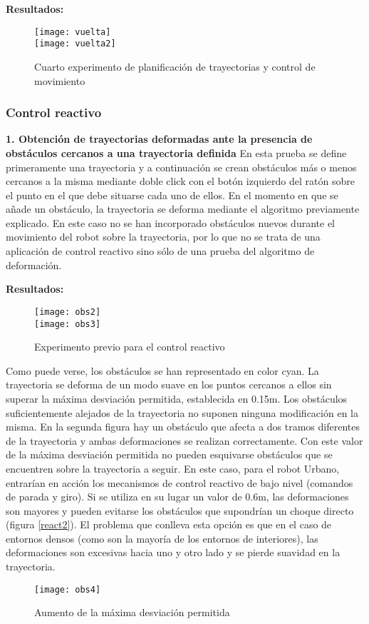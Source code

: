 \textbf{Resultados:}
\begin{figure}[h]
  \centering\texttt{[image: vuelta]}\\
  \hspace{0.5cm}\texttt{[image: vuelta2]}
  \caption{Cuarto experimento de planificación de trayectorias y control de movimiento}\label{fg:mov4}
\end{figure}


\subsubsection{Control reactivo}

\noindent
\textbf{\textbf{1.} Obtención de trayectorias deformadas ante la presencia de obstáculos cercanos a una trayectoria definida}
En esta prueba se define primeramente una trayectoria y a continuación se crean obstáculos más o menos cercanos a la misma mediante doble click con el botón izquierdo del ratón sobre el punto en el que debe situarse cada uno de ellos. En el momento en que se añade un obstáculo, la trayectoria se deforma mediante el algoritmo previamente explicado. En este caso no se han incorporado obstáculos nuevos durante el movimiento del robot sobre la trayectoria, por lo que no se trata de una aplicación de control reactivo sino sólo de una prueba del algoritmo de deformación.

\textbf{Resultados:}
\begin{figure}[h]
  \centering\texttt{[image: obs2]}\\
  \hspace{0.5cm}\texttt{[image: obs3]}
  \caption{Experimento previo para el control reactivo}\label{fg:react1}
\end{figure}


Como puede verse, los obstáculos se han representado en color cyan. La trayectoria se deforma de un modo suave en los puntos cercanos a ellos sin superar la máxima desviación permitida, establecida en 0.15m. Los obstáculos suficientemente alejados de la trayectoria no suponen ninguna modificación en la misma. En la segunda figura hay un obstáculo que afecta a dos tramos diferentes de la trayectoria y ambas deformaciones se realizan correctamente. Con este valor de la máxima desviación permitida no pueden esquivarse obstáculos que se encuentren sobre la trayectoria a seguir. En este caso, para el robot Urbano, entrarían en acción los mecanismos de control reactivo de bajo nivel (comandos de parada y giro). Si se utiliza en su lugar un valor de 0.6m, las deformaciones son mayores y pueden evitarse los obstáculos que supondrían un choque directo (figura \ref{react2}). El problema que conlleva esta opción es que en el caso de entornos densos (como son la mayoría de los entornos de interiores), las deformaciones son excesivas hacia uno y otro lado y se pierde suavidad en la trayectoria.
\begin{figure}[h]
  \centering\texttt{[image: obs4]}\\
  \caption{Aumento de la máxima desviación permitida}\label{fg:react2}
\end{figure}


